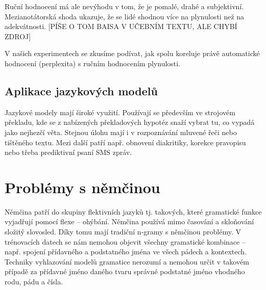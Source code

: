 \documentclass[12pt,a4paper]{report}
\begin{document}
Ruční hodnocení má ale nevýhodu v tom, že je pomalé, drahé a subjektivní. Mezianotátorská shoda ukazuje, že se lidé shodnou více na plynulosti než na adekvátnosti. [PÍŠE O TOM BAISA V UČEBNÍM TEXTU, ALE CHYBÍ ZDROJ]

V našich experimentech se zkusíme podívat, jak spolu koreluje právě automatické hodnocení (perplexita) s ručním hodnocením plynulosti.


\section{Aplikace jazykových modelů}
Jazykové modely mají široké využití. Používají se především ve strojovém překladu, kde se z nabízených překladových hypotéz snaží vybrat tu, co vypadá jako nejhezčí věta. Stejnou úlohu mají i v rozpoznávání mluvené řeči nebo tištěného textu. Mezi další patří např. obnovení diakritiky, korekce pravopisu nebo třeba prediktivní psaní SMS zpráv.

\chapter{Problémy s němčinou}
Němčina patří do skupiny flektivních jazyků tj. takových, které gramatické funkce vyjadřují pomocí flexe -- ohýbání. Němčina používá mimo časování a skloňování složitý slovosled. Díky tomu mají tradiční n-gramy s němčinou problémy. V trénovacích datech se nám nemohou objevit všechny gramatické kombinace -- např. spojení přídavného a podstatného jména ve všech pádech a kontextech. Techniky vyhlazování modelů gramatice nerozumí a nemohou určit v takovém případě za přídavné jméno daného tvaru správné podstatné jméno vhodného rodu, pádu a čísla.
\end{document}
